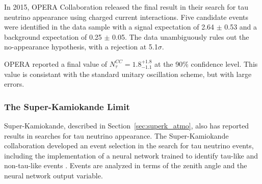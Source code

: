 In 2015, OPERA Collaboration released the final result in their search for tau neutrino appearance using charged current interactions.
Five candidate events were identified in the data sample with a signal expectation of 2.64 $\pm$ 0.53 and a background expectation of 0.25 $\pm$ 0.05.
The data unambiguously rules out the no-appearance hypothesis, with a rejection at 5.1$\sigma$.

OPERA reported a final value of $N^{CC}_\tau=1.8^{+1.8}_{-1.1}$ at the 90\% confidence level. 
This value is consistant with the standard unitary oscillation scheme, but with large errors.

\label{subsubsec:superk_limit}
\subsubsection{The Super-Kamiokande Limit}
Super-Kamiokande, described in Section~\ref{sec:superk_atmo}, also has reported results in searches for tau neutrino appearance.
The Super-Kamiokande collaboration developed an event selection in the search for tau neutrino events, including the implementation of a neural network trained to identify tau-like and non-tau-like events \cite{SuperK-Tau2013,SuperK-Tau2017}.
Events are analyzed in terms of the zenith angle and the neural network output variable.

